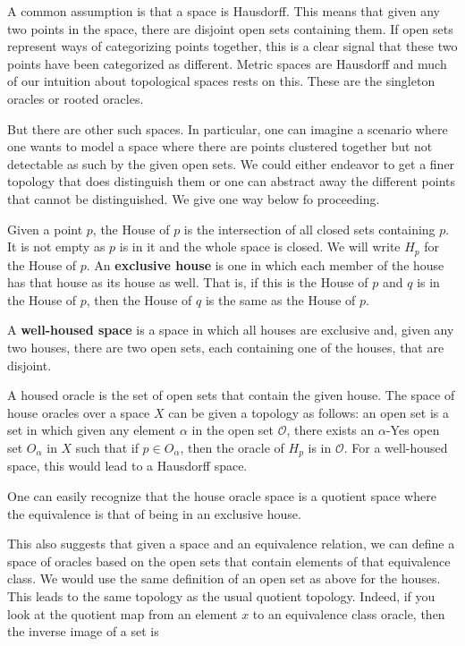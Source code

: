 \documentclass[12pt]{article}
\begin{document}
A common assumption is that a space is Hausdorff. This means that given any two points in the space, there are disjoint open sets containing them. If open sets represent ways of categorizing points together, this is a clear signal that these two points have been categorized as different. Metric spaces are Hausdorff and much of our intuition about topological spaces rests on this. These are the singleton oracles or rooted oracles. 

But there are other such spaces. In particular, one can imagine a scenario where one wants to model a space where there are points clustered together but not detectable as such by the given open sets. We could either endeavor to get a finer topology that does distinguish them or one can abstract away the different points that cannot be distinguished. We give one way below fo proceeding. 

Given a point $p$, the House of $p$ is the intersection of all closed sets containing $p$. It is not empty as $p$ is in it and the whole space is closed. We will write $H_p$ for the House of $p$. An \textbf{exclusive house} is one in which each member of the house has that house as its house as well. That is, if this is the House of $p$ and $q$ is in the House of $p$, then the House of $q$ is the same as the House of $p$. 

A \textbf{well-housed space} is a space in which all houses are exclusive and, given any two houses, there are two open sets, each containing one of the houses, that are disjoint. 

A housed oracle is the set of open sets that contain the given house. The space of house oracles over a space $X$ can be given a topology as follows: an open set is a set in which given any element $\alpha$ in the open set $\mathcal{O}$, there exists an $\alpha$-Yes open set $O_{\alpha}$ in $X$ such that if $p \in O_{\alpha}$, then the oracle of $H_p$ is in $\mathcal{O}$. For a well-housed space, this would lead to a Hausdorff space. 

One can easily recognize that the house oracle space is a quotient space where the equivalence is that of being in an exclusive house.  

This also suggests that given a space and an equivalence relation, we can define a space of oracles based on the open sets that contain elements of that equivalence class. We would use the same definition of an open set as above for the houses. This leads to the same topology as the usual quotient topology. Indeed, if you look at the quotient map from an element $x$ to an equivalence class oracle, then the inverse image of a set is  
\end{document}
